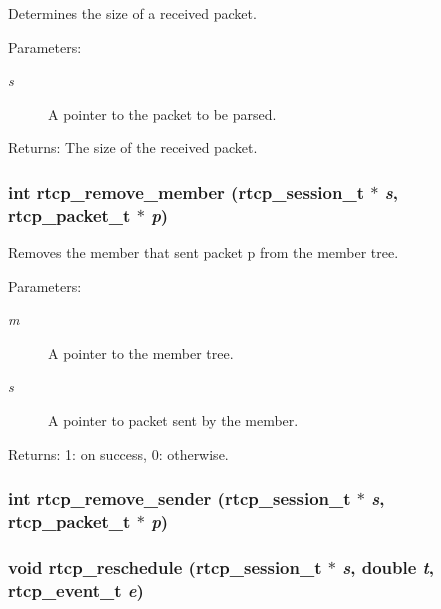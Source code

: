 Determines the size of a received packet. \begin{Desc}
\item[Parameters:]
\begin{description}
\item[{\em s}]A pointer to the packet to be parsed. \end{description}
\end{Desc}
\begin{Desc}
\item[Returns:]The size of the received packet. \end{Desc}
\subsubsection{\setlength{\rightskip}{0pt plus 5cm}int rtcp\_\-remove\_\-member ({\bf rtcp\_\-session\_\-t} $\ast$ {\em s}, {\bf rtcp\_\-packet\_\-t} $\ast$ {\em p})}\label{rtcp_8c_a7}


Removes the member that sent packet p from the member tree. \begin{Desc}
\item[Parameters:]
\begin{description}
\item[{\em m}]A pointer to the member tree. \item[{\em s}]A pointer to packet sent by the member. \end{description}
\end{Desc}
\begin{Desc}
\item[Returns:]1: on success, 0: otherwise. \end{Desc}
\subsubsection{\setlength{\rightskip}{0pt plus 5cm}int rtcp\_\-remove\_\-sender ({\bf rtcp\_\-session\_\-t} $\ast$ {\em s}, {\bf rtcp\_\-packet\_\-t} $\ast$ {\em p})}\label{rtcp_8c_a9}


\subsubsection{\setlength{\rightskip}{0pt plus 5cm}void rtcp\_\-reschedule ({\bf rtcp\_\-session\_\-t} $\ast$ {\em s}, double {\em t}, {\bf rtcp\_\-event\_\-t} {\em e})\hspace{0.3cm}{\tt  [static]}}\label{rtcp_8c_a23}


